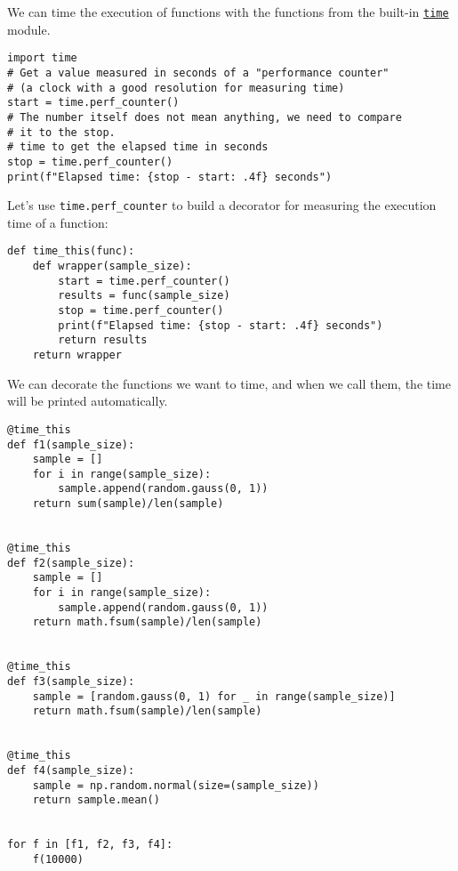 \documentclass[12pt, a4paper]{article}
\begin{document}
We can time the execution of functions with the functions from the built-in \href{https://docs.python.org/3/library/time.html}{\texttt{time}} module.
\lstset{language=jupyter-python,label= ,caption= ,captionpos=b,numbers=none}
\begin{lstlisting}
import time
# Get a value measured in seconds of a "performance counter"
# (a clock with a good resolution for measuring time)
start = time.perf_counter()
# The number itself does not mean anything, we need to compare
# it to the stop.
# time to get the elapsed time in seconds
stop = time.perf_counter()
print(f"Elapsed time: {stop - start: .4f} seconds")
\end{lstlisting}

Let's use \texttt{time.perf\_counter} to build a decorator for measuring the execution time of a function:
\lstset{language=jupyter-python,label= ,caption= ,captionpos=b,numbers=none}
\begin{lstlisting}
def time_this(func):
    def wrapper(sample_size):
        start = time.perf_counter()
        results = func(sample_size)
        stop = time.perf_counter()
        print(f"Elapsed time: {stop - start: .4f} seconds")
        return results
    return wrapper
\end{lstlisting}

We can decorate the functions we want to time, and when we call them, the time will be printed automatically.
\lstset{language=jupyter-python,label= ,caption= ,captionpos=b,numbers=none}
\begin{lstlisting}
@time_this
def f1(sample_size):
    sample = []
    for i in range(sample_size):
        sample.append(random.gauss(0, 1))
    return sum(sample)/len(sample)


@time_this
def f2(sample_size):
    sample = []
    for i in range(sample_size):
        sample.append(random.gauss(0, 1))
    return math.fsum(sample)/len(sample)


@time_this
def f3(sample_size):
    sample = [random.gauss(0, 1) for _ in range(sample_size)]
    return math.fsum(sample)/len(sample)


@time_this
def f4(sample_size):
    sample = np.random.normal(size=(sample_size))
    return sample.mean()


for f in [f1, f2, f3, f4]:
    f(10000)
\end{lstlisting}
\end{document}
